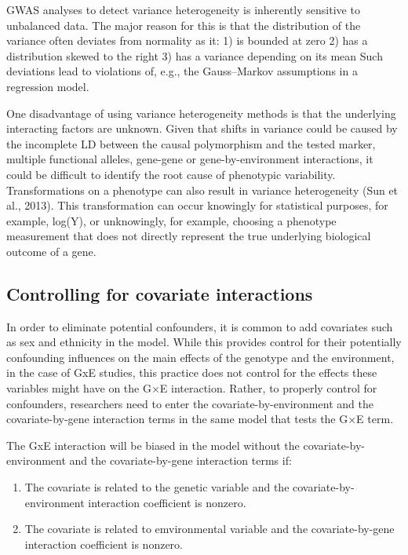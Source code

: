 \documentclass[
]{book}
\providecommand{\tightlist}{%
  \setlength{\itemsep}{0pt}\setlength{\parskip}{0pt}}
\begin{document}
GWAS analyses to detect variance heterogeneity is inherently sensitive to unbalanced data. The major reason for this is that the distribution of the variance often deviates from normality as it:
1) is bounded at zero
2) has a distribution skewed to the right
3) has a variance depending on its mean
Such deviations lead to violations of, e.g., the Gauss--Markov assumptions in a regression model.

One disadvantage of using variance heterogeneity methods is that the underlying interacting factors are unknown. Given that shifts in variance could be caused by the incomplete LD between the causal polymorphism and the tested marker, multiple functional alleles, gene-gene or gene-by-environment interactions, it could be difficult to identify the root cause of phenotypic variability. Transformations on a phenotype can also result in variance heterogeneity (Sun et al., 2013). This transformation can occur knowingly for statistical purposes, for example, log(Y), or unknowingly, for example, choosing a phenotype measurement that does not directly represent the true underlying biological outcome of a gene.

\hypertarget{controlling-for-covariate-interactions}{%
\subsection{Controlling for covariate interactions}\label{controlling-for-covariate-interactions}}

In order to eliminate potential confounders, it is common to add covariates such as sex and ethnicity in the model. While this provides control for their potentially confounding influences on the main effects of the genotype and the environment, in the case of GxE studies, this practice does not control for the effects these variables might have on the G×E interaction. Rather, to properly control for confounders, researchers need to enter the covariate-by-environment and the covariate-by-gene interaction terms in the same model that tests the G×E term.

The GxE interaction will be biased in the model without the covariate-by-environment and the covariate-by-gene interaction terms if:

\begin{enumerate}
\def\labelenumi{\arabic{enumi})}
\tightlist
\item
  The covariate is related to the genetic variable and the covariate-by-environment interaction coefficient is nonzero.
\item
  The covariate is related to emvironmental variable and the covariate-by-gene interaction coefficient is nonzero.
\end{enumerate}
\end{document}
